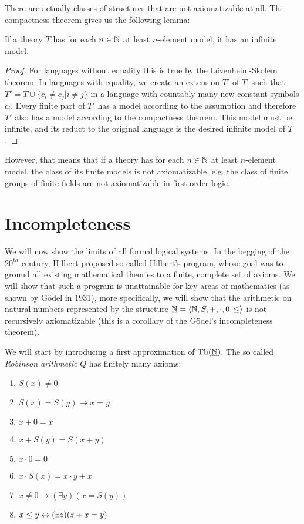 There are actually classes of structures that are not axiomatizable at all. The compactness theorem gives us the following lemma:

\begin{lemma}
If a theory $T$ has for each $n \in \mathbb{N}$ at least $n$-element model, it has an infinite model.
\end{lemma}
\begin{proof}
For languages without equality this is true by the Lövenheim-Skolem theorem. In languages with equality, we create an extension $T'$ of $T$, such that $T' = T \cup \{c_i \neq c_j| i \neq j\}$ in a language with countably many new constant symbols $c_i$. Every finite part of $T'$ has a model according to the assumption and therefore $T'$ also has a model according to the compactness theorem. This model must be infinite, and its reduct to the original language is the desired infinite model of $T$.
\end{proof}

However, that means that if a theory has for each $n \in \mathbb{N}$ at least $n$-element model, the class of its finite models is not axiomatizable, e.g. the class of finite groups of finite fields are not axiomatizable in first-order logic.

\section{Incompleteness}

We will now show the limits of all formal logical systems. In the begging of the $20^{th}$ century, Hilbert proposed so called Hilbert's program, whose goal was to ground all existing mathematical theories to a finite, complete set of axioms. We will show that such a program is unattainable for key areas of mathematics (as shown by Gödel in 1931), more specifically, we will show that the arithmetic on natural numbers represented by the structure $\underline{\mathbb{N}} = \langle \mathbb{N}, S, +, \cdot, 0, \leq \rangle$ is not recursively axiomatizable (this is a corollary of the Gödel's incompleteness theorem).

We will start by introducing a first approximation of $\operatorname{Th}(\underline{\mathbb{N}})$. The so called \emph{Robinson arithmetic} $Q$ has finitely many axioms:
\begin{multicols}{2}
\begin{enumerate}
  \item $S(x) \neq 0$
  \item $S(x) = S(y) \to x = y$
  \item $x + 0 = x$
  \item $x + S(y) = S(x+y)$
  \columnbreak
  \item $x \cdot 0 = 0$
  \item $x \cdot S(x) = x \cdot y + x$
  \item $x \neq 0 \to (\exists y)(x = S(y))$
  \item $x \leq y \leftrightarrow (\exists z)(z +x = y)$
\end{enumerate}
\end{multicols}

